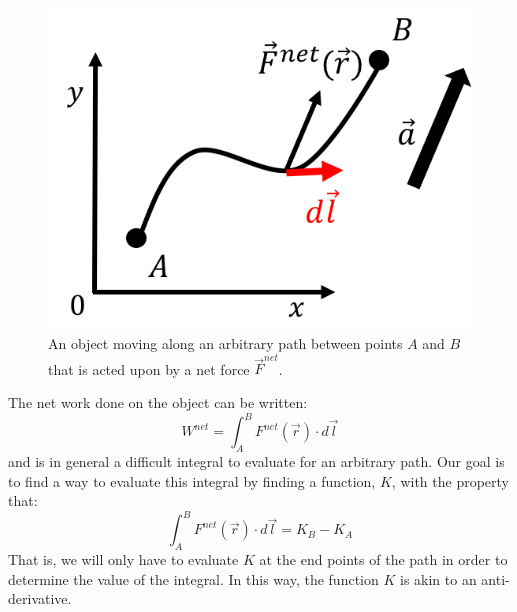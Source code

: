\begin{figure}[!htbp]
\centering
\includegraphics[width=0.4\linewidth]{files/kepath-c0a19725a0d065d2bda035ac72018b9c.png}
\caption[]{An object moving along an arbitrary path between points $A$ and $B$ that is acted upon by a net force $\vec F^{net}$.}
\label{fig:workenergy:kepath}
\end{figure}

The net work done on the object can be written:
\begin{equation}
W^{net} = \int_A^B F^{net}(\vec r) \cdot d\vec l
\end{equation}
and is in general a difficult integral to evaluate for an arbitrary path. Our goal is to find a way to evaluate this integral by finding a function, $K$, with the property that:
\begin{equation}
\int_A^B F^{net}(\vec r) \cdot d\vec l =K_B - K_A
\end{equation}
That is, we will only have to evaluate $K$ at the end points of the path in order to determine the value of the integral. In this way, the function $K$ is akin to an anti-derivative.

